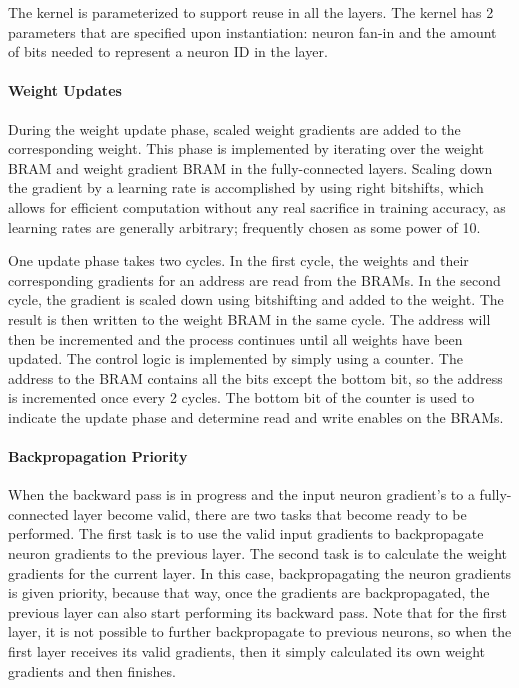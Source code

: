 The kernel is parameterized to support reuse in all the layers. The kernel has 2 parameters that are specified upon instantiation: neuron fan-in and the amount of bits needed to represent a neuron ID in the layer.

\paragraph{Weight Updates}
During the weight update phase, scaled weight gradients are added to the corresponding weight. This phase is implemented by iterating over the weight BRAM and weight gradient BRAM in the fully-connected layers. Scaling down the gradient by a learning rate is accomplished by using right bitshifts, which allows for efficient computation without any real sacrifice in training accuracy, as learning rates are generally arbitrary; frequently chosen as some power of 10.

One update phase takes two cycles. In the first cycle, the weights and their corresponding gradients for an address are read from the BRAMs. In the second cycle, the gradient is scaled down using bitshifting and added to the weight. The result is then written to the weight BRAM in the same cycle. The address will then be incremented and the process continues until all weights have been updated. The control logic is implemented by simply using a counter. The address to the BRAM contains all the bits except the bottom bit, so the address is incremented once every 2 cycles. The bottom bit of the counter is used to indicate the update phase and determine read and write enables on the BRAMs.

\paragraph{Backpropagation Priority}
When the backward pass is in progress and the input neuron gradient's to a fully-connected layer become valid, there are two tasks that become ready to be performed. The first task is to use the valid input gradients to backpropagate neuron gradients to the previous layer. The second task is to calculate the weight gradients for the current layer. In this case, backpropagating the neuron gradients is given priority, because that way, once the gradients are backpropagated, the previous layer can also start performing its backward pass. Note that for the first layer, it is not possible to further backpropagate to previous neurons, so when the first layer receives its valid gradients, then it simply calculated its own weight gradients and then finishes.


